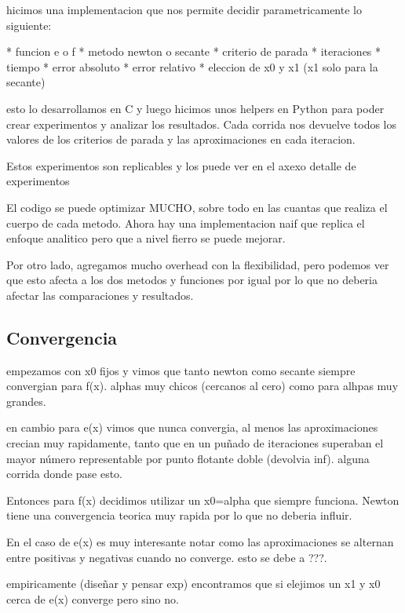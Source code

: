 \documentclass[10pt,a4paper]{article} \usepackage[utf8]{inputenc} %
\begin{document}
hicimos una implementacion que nos permite decidir parametricamente lo siguiente:

* funcion e o f
* metodo newton o secante
* criterio de parada
  * iteraciones
  * tiempo
  * error absoluto
  * error relativo
* eleccion de x0 y x1 (x1 solo para la secante)

esto lo desarrollamos en C y luego hicimos unos helpers en Python para poder
crear experimentos y analizar los resultados. Cada corrida nos devuelve todos
los valores de los criterios de parada y las aproximaciones en cada iteracion.

Estos experimentos son replicables y los puede ver en el axexo {detalle de experimentos}

El codigo se puede optimizar MUCHO, sobre todo en las cuantas que realiza el
cuerpo de cada metodo. Ahora hay una implementacion naif que replica el enfoque
analitico pero que a nivel fierro se puede mejorar.

Por otro lado, agregamos mucho overhead con la flexibilidad, pero podemos ver
que esto afecta a los dos metodos y funciones por igual por lo que no deberia
afectar las comparaciones y resultados.

\subsection{Convergencia}

empezamos con x0 fijos y vimos que tanto newton como secante siempre convergian
para f(x). %
alphas muy chicos (cercanos al cero) como para alhpas muy grandes.

en cambio para e(x) vimos que nunca convergia, al menos las aproximaciones
crecian muy rapidamente, tanto que en un puñado de iteraciones superaban el
mayor número representable por punto flotante doble (devolvia inf). %
alguna corrida donde pase esto.

Entonces para f(x) decidimos utilizar un x0=alpha que siempre funciona. Newton
tiene una convergencia teorica muy rapida por lo que no deberia influir.

En el caso de e(x) es muy interesante notar como las aproximaciones se alternan
entre positivas y negativas cuando no converge. esto se debe a ???.


empiricamente (diseñar y pensar exp) encontramos que si elejimos un x1 y x0
cerca de e(x) converge pero sino no.
\end{document}

